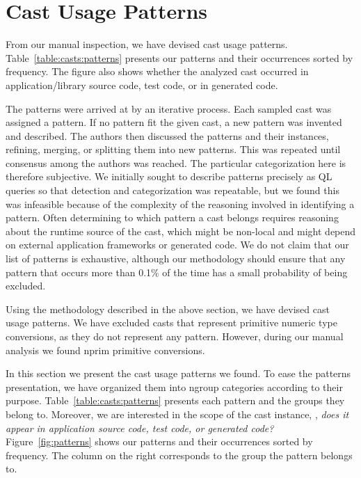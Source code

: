 
\section{Cast Usage Patterns}
\label{sec:casts:patterns}

From our manual inspection, we have devised \nPattern{} cast usage patterns.
Table~\ref{table:casts:patterns} presents our patterns and their occurrences sorted by frequency.
The figure also shows whether the analyzed cast occurred in
application/library source code, test code, or in generated code.

The patterns were arrived at by an iterative process.
Each sampled cast was assigned a pattern.
If no pattern fit the given cast,
a new pattern was invented and described.
The authors then discussed the patterns and their instances,
refining, merging, or splitting them into new patterns.
This was repeated until consensus among the authors was reached.
The particular categorization here is therefore subjective.
%
We initially sought to describe patterns precisely as QL queries so that
detection and categorization was repeatable,
but we found this was infeasible because of the complexity of the reasoning 
involved in identifying a pattern.
Often determining to which pattern a cast belongs
requires reasoning about the runtime source of the cast, which might be
non-local and might depend on external application frameworks or generated
code.
%
We do not claim that our list of patterns is exhaustive, although our
methodology should ensure that any pattern that occurs more than 0.1\% of the
time has a small probability of being excluded.

Using the methodology described in the above section,
we have devised \nPattern{} cast usage patterns.
We have excluded casts that represent primitive numeric type conversions,
as they do not represent any pattern.
However, during our manual analysis we found nprim{} primitive conversions.

In this section we present the cast usage patterns we found.
To ease the patterns presentation,
we have organized them into ngroup{} categories according to their purpose.
Table~\ref{table:casts:patterns} presents each pattern and the groups they belong to.
Moreover, we are interested in the scope of the cast instance,
\ie, \emph{does it appear in application source code, test code, or generated code?}
Figure~\ref{fig:patterns} shows our patterns and their occurrences sorted by frequency.
The column on the right corresponds to the group the pattern belongs to.


